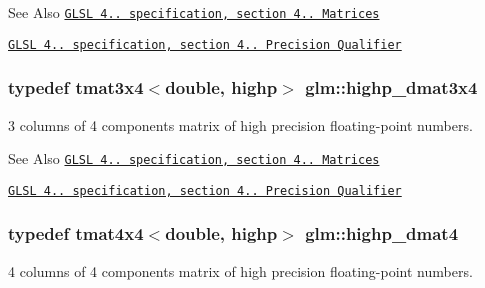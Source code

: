 \begin{DoxySeeAlso}{See Also}
\href{http://www.opengl.org/registry/doc/GLSLangSpec.4.20.8.pdf}{\tt G\-L\-S\-L 4.. specification, section 4.. Matrices} 

\href{http://www.opengl.org/registry/doc/GLSLangSpec.4.20.8.pdf}{\tt G\-L\-S\-L 4.. specification, section 4.. Precision Qualifier} 
\end{DoxySeeAlso}
\hypertarget{group__core__precision_ga2f3cf8e3bd4ea0beeefe56b45b14118b}{
\subsubsection[{highp\-\_\-dmat3x4}]{\setlength{\rightskip}{0pt plus 5cm}typedef tmat3x4$<$double, highp$>$ {\bf glm\-::highp\-\_\-dmat3x4}}}\label{group__core__precision_ga2f3cf8e3bd4ea0beeefe56b45b14118b}
3 columns of 4 components matrix of high precision floating-\/point numbers.

\begin{DoxySeeAlso}{See Also}
\href{http://www.opengl.org/registry/doc/GLSLangSpec.4.20.8.pdf}{\tt G\-L\-S\-L 4.. specification, section 4.. Matrices} 

\href{http://www.opengl.org/registry/doc/GLSLangSpec.4.20.8.pdf}{\tt G\-L\-S\-L 4.. specification, section 4.. Precision Qualifier} 
\end{DoxySeeAlso}
\hypertarget{group__core__precision_ga457246aa7c671b1ed3dce700b3c1d4c0}{
\subsubsection[{highp\-\_\-dmat4}]{\setlength{\rightskip}{0pt plus 5cm}typedef tmat4x4$<$double, highp$>$ {\bf glm\-::highp\-\_\-dmat4}}}\label{group__core__precision_ga457246aa7c671b1ed3dce700b3c1d4c0}
4 columns of 4 components matrix of high precision floating-\/point numbers.

